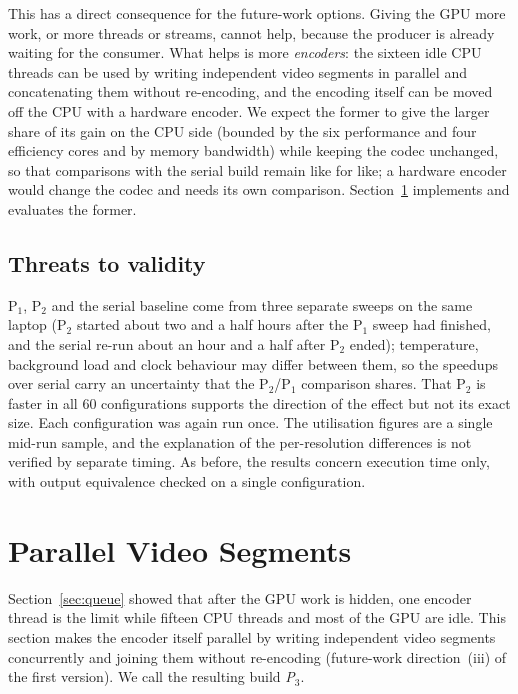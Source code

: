 \documentclass[conference]{IEEEtran}
\begin{document}
This has a direct consequence for the future-work options. Giving the GPU more work, or more threads or streams, cannot help, because the producer is already waiting for the consumer. What helps is more \emph{encoders}: the sixteen idle CPU threads can be used by writing independent video segments in parallel and concatenating them without re-encoding, and the encoding itself can be moved off the CPU with a hardware encoder. We expect the former to give the larger share of its gain on the CPU side (bounded by the six performance and four efficiency cores and by memory bandwidth) while keeping the codec unchanged, so that comparisons with the serial build remain like for like; a hardware encoder would change the codec and needs its own comparison. Section~\ref{sec:segments} implements and evaluates the former.

\subsection{Threats to validity}
\label{sec:queue-validity}
P$_1$, P$_2$ and the serial baseline come from three separate sweeps on the same laptop (P$_2$ started about two and a half hours after the P$_1$ sweep had finished, and the serial re-run about an hour and a half after P$_2$ ended); temperature, background load and clock behaviour may differ between them, so the speedups over serial carry an uncertainty that the P$_2$/P$_1$ comparison shares. That P$_2$ is faster in all $60$ configurations supports the direction of the effect but not its exact size. Each configuration was again run once. The utilisation figures are a single mid-run sample, and the explanation of the per-resolution differences is not verified by separate timing. As before, the results concern execution time only, with output equivalence checked on a single configuration.

\section{Parallel Video Segments}
\label{sec:segments}
Section~\ref{sec:queue} showed that after the GPU work is hidden, one encoder thread is the limit while fifteen CPU threads and most of the GPU are idle. This section makes the encoder itself parallel by writing independent video segments concurrently and joining them without re-encoding (future-work direction~(iii) of the first version). We call the resulting build \emph{P$_3$}.
\end{document}
